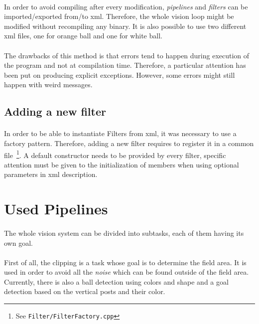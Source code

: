 \documentclass[a4paper,12pt]{article}
\begin{document}
\paragraph{}
In order to avoid compiling after every modification, \emph{pipelines} and
\emph{filters} can be imported/exported from/to xml. Therefore, the whole
vision loop might be modified without recompiling any binary. It is also
possible to use two different xml files, one for orange ball and one for white
ball.
\paragraph{}
The drawbacks of this method is that errors tend to happen during execution of
the program and not at compilation time. Therefore, a particular attention has
been put on producing explicit exceptions. However, some errors might still
happen with weird messages.

\subsection{Adding a new filter}
\paragraph{}
In order to be able to instantiate Filters from xml, it was necessary to use
a factory pattern. Therefore, adding a new filter requires to register it in
a common file~\footnote{See \verb!Filter/FilterFactory.cpp!}. A default
constructor needs to be provided by every filter, specific attention must
be given to the initialization of members when using optional parameters in xml
description.


\section{\label{sec:UsedPipelines}Used Pipelines}
\paragraph{}
The whole vision system can be divided into subtasks, each of them having its
own goal.

\paragraph{}
First of all, the clipping is a task whose goal is to determine the field area.
It is used in order to avoid all the \emph{noise} which can be found outside of
the field area. Currently, there is also a ball detection using colors and
shape and a goal detection based on the vertical posts and their color.
\end{document}
